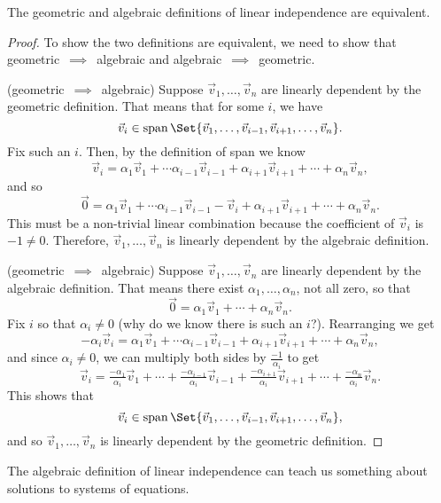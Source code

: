 \begin{theorem}
	The geometric and algebraic definitions of linear independence are equivalent.
\end{theorem}
\begin{proof}
	To show the two definitions are equivalent, we need to show that geometric~$\implies$~algebraic
	and algebraic~$\implies$~geometric.

	\medskip
	\noindent
	(geometric~$\implies$~algebraic) Suppose $\vec v_1,\ldots,\vec v_n$ are linearly dependent by the 
	geometric definition. That means that for some $i$, we have
	\[
		\vec v_i \in \Span\Set{\vec v_1,\ldots,\vec v_{i-1},\vec v_{i+1},\ldots,\vec v_n}.
	\]
	Fix such an $i$. Then, by the definition of span we know
	\[
		\vec v_i=\alpha_1\vec v_1+\cdots \alpha_{i-1}\vec v_{i-1}+\alpha_{i+1}\vec v_{i+1}+\cdots +\alpha_n\vec v_n,
	\]
	and so
	\[
		\vec 0=\alpha_1\vec v_1+\cdots \alpha_{i-1}\vec v_{i-1}-\vec v_i+\alpha_{i+1}\vec v_{i+1}+\cdots +\alpha_n\vec v_n.
	\]
	This must be a non-trivial linear combination because the coefficient of $\vec v_i$ is $-1\neq 0$. Therefore, 
	$\vec v_1,\ldots,\vec v_n$ is linearly dependent by the algebraic definition.
	
	\medskip
	\noindent
	(geometric~$\implies$~algebraic) Suppose $\vec v_1,\ldots,\vec v_n$ are linearly dependent by the 
	algebraic definition. That means there exist $\alpha_1,\ldots,\alpha_n$, not all zero, so that
	\[
		\vec 0=\alpha_1\vec v_1+\cdots +\alpha_n\vec v_n.
	\]
	Fix $i$ so that $\alpha_i\neq 0$ (why do we know there is such an $i$?). Rearranging we get
	\[
		-\alpha_i\vec v_i=\alpha_1\vec v_1+\cdots \alpha_{i-1}\vec v_{i-1}+\alpha_{i+1}\vec v_{i+1}+\cdots +\alpha_n\vec v_n,
	\]
	and since $\alpha_i\neq 0$, we can multiply both sides by $\frac{-1}{\alpha_i}$ to get
	\[
		\vec v_i=\tfrac{-\alpha_1}{\alpha_i}\vec v_1+\cdots +\tfrac{-\alpha_{i-1}}{\alpha_i}\vec v_{i-1}
	+\tfrac{-\alpha_{i+1}}{\alpha_i}\vec v_{i+1}+\cdots +\tfrac{-\alpha_n}{\alpha_i}\vec v_n.
	\]
	This shows that
	\[
		\vec v_i \in \Span\Set{\vec v_1,\ldots,\vec v_{i-1},\vec v_{i+1},\ldots,\vec v_n},
	\]
	and so $\vec v_1,\ldots,\vec v_n$ is linearly dependent by the geometric definition.
\end{proof}


The algebraic definition of linear independence can teach us something about
solutions to systems of equations. 

